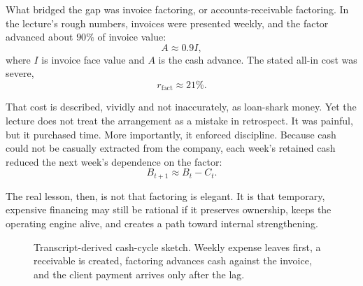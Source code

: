What bridged the gap was invoice factoring, or accounts-receivable factoring. In the lecture's rough numbers, invoices were presented weekly, and the factor advanced about \(90\%\) of invoice value:
\begin{equation}
A \approx 0.9 I,
\end{equation}
where \(I\) is invoice face value and \(A\) is the cash advance. The stated all-in cost was severe,
\begin{equation}
r_{\mathrm{fact}} \approx 21\%.
\end{equation}

That cost is described, vividly and not inaccurately, as loan-shark money. Yet the lecture does not treat the arrangement as a mistake in retrospect. It was painful, but it purchased time. More importantly, it enforced discipline. Because cash could not be casually extracted from the company, each week's retained cash reduced the next week's dependence on the factor:
\begin{equation}
B_{t+1}\approx B_t - C_t.
\end{equation}

The real lesson, then, is not that factoring is elegant. It is that temporary, expensive financing may still be rational if it preserves ownership, keeps the operating engine alive, and creates a path toward internal strengthening.

\begin{figure}[h]
\centering
{}
\caption{Transcript-derived cash-cycle sketch. Weekly expense leaves first, a receivable is created, factoring advances cash against the invoice, and the client payment arrives only after the lag.}
\end{figure}

